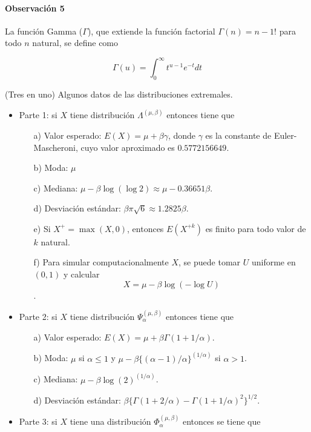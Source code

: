 \documentclass[
  12pt]{article}
\begin{document}
\paragraph*{Observación 5}

La función Gamma (\(\Gamma\)), que extiende la función factorial
\(\Gamma(n)=n-1!\) para todo \(n\) natural, se define como

\begin{equation}
\Gamma(u)=\int_0^{\infty}t^{u-1}e^{-t}dt
\end{equation}

\begin{theorem}
(Tres en uno) Algunos datos de las distribuciones extremales.
\begin{itemize}
\item Parte 1: si $X$ tiene distribución $\Lambda^{(\mu,\beta)}$ entonces tiene que
\begin{itemize}
  \item[a)] Valor esperado: $E(X) = \mu + \beta\gamma$, donde $\gamma$ es la constante de Euler-Mascheroni, cuyo valor aproximado es $0.5772156649$.
  \item[b)] Moda: $\mu$
  \item[c)] Mediana: $\mu - \beta \log(\log 2) \approx \mu - 0.36651 \beta$.
  \item[d)] Desviación estándar: $\beta \pi \sqrt{6} \approx 1.2825 \beta$.
  \item[e)] Si $X^+ = \max(X,0)$, entonces $E(X^{+k})$ es finito para todo valor de $k$ natural.
  \item[f)] Para simular computacionalmente $X$, se puede tomar $U$ uniforme en $(0,1)$ y  calcular $$X = \mu - \beta \log(-\log U)$$.
\end{itemize}
\item Parte 2: si $X$ tiene distribución $\Psi_{\alpha}^{(\mu,\beta)}$ entonces tiene que
\begin{itemize}
  \item[a)] Valor esperado: $E(X) = \mu + \beta\Gamma(1+1/\alpha)$.
  \item[b)] Moda: $\mu$ si $\alpha\leq 1$ y $\mu-\beta\{(\alpha-1)/\alpha\}^{(1/\alpha)}$ si $\alpha>1$.
  \item[c)] Mediana: $\mu - \beta \log(2)^{(1/\alpha)}$.
  \item[d)] Desviación estándar: $\beta\{\Gamma(1+2/\alpha)-\Gamma(1+1/\alpha)^2\}^{1/2}$.
\end{itemize}
\item Parte 3: si $X$ tiene una distribución $\Phi_{\alpha}^{(\mu, \beta)}$ entonces se tiene que

\end{itemize}
\end{theorem}
\end{document}
